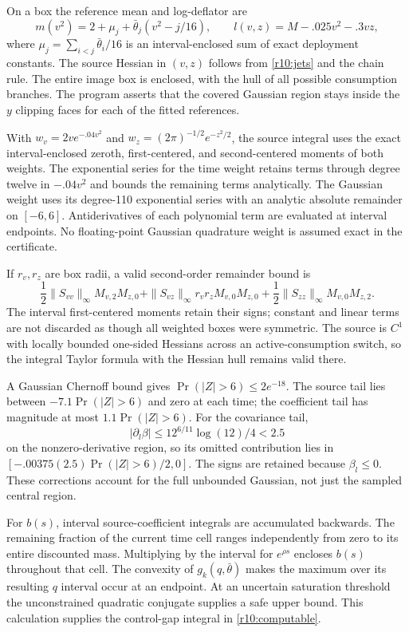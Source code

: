 On a box the reference mean and log-deflator are
\[
 m(v^2)=2+\mu_j+\bar\theta_j(v^2-j/16),\qquad
 l(v,z)=M-.025v^2-.3vz,
\]
where $\mu_j=\sum_{i<j}\bar\theta_i/16$ is an interval-enclosed sum of exact deployment constants. The source Hessian in $(v,z)$ follows from \eqref{r10:jets} and the chain rule. The entire image box is enclosed, with the hull of all possible consumption branches. The program asserts that the covered Gaussian region stays inside the $y$ clipping faces for each of the fitted references.

With $w_v=2ve^{-.04v^2}$ and $w_z=(2\pi)^{-1/2}e^{-z^2/2}$, the source integral uses the exact interval-enclosed zeroth, first-centered, and second-centered moments of both weights. The exponential series for the time weight retains terms through degree twelve in $-.04v^2$ and bounds the remaining terms analytically. The Gaussian weight uses its degree-110 exponential series with an analytic absolute remainder on $[-6,6]$. Antiderivatives of each polynomial term are evaluated at interval endpoints. No floating-point Gaussian quadrature weight is assumed exact in the certificate.

If $r_v,r_z$ are box radii, a valid second-order remainder bound is
\[
 \frac12\|S_{vv}\|_\infty M_{v,2}M_{z,0}
 +\|S_{vz}\|_\infty r_vr_zM_{v,0}M_{z,0}
 +\frac12\|S_{zz}\|_\infty M_{v,0}M_{z,2}.
\]
The interval first-centered moments retain their signs; constant and linear terms are not discarded as though all weighted boxes were symmetric. The source is $C^1$ with locally bounded one-sided Hessians across an active-consumption switch, so the integral Taylor formula with the Hessian hull remains valid there.

A Gaussian Chernoff bound gives $\Pr(|Z|>6)\leq2e^{-18}$. The source tail lies between $-7.1\Pr(|Z|>6)$ and zero at each time; the coefficient tail has magnitude at most $1.1\Pr(|Z|>6)$. For the covariance tail,
\[
 |\partial_l\beta|\leq12^{6/11}\log(12)/4<2.5
\]
on the nonzero-derivative region, so its omitted contribution lies in
$[-.00375(2.5)\Pr(|Z|>6)/2,0]$. The signs are retained because $\beta_l\leq0$. These corrections account for the full unbounded Gaussian, not just the sampled central region.

For $b(s)$, interval source-coefficient integrals are accumulated backwards. The remaining fraction of the current time cell ranges independently from zero to its entire discounted mass. Multiplying by the interval for $e^{\rho s}$ encloses $b(s)$ throughout that cell. The convexity of $g_k(q,\bar\theta)$ makes the maximum over its resulting $q$ interval occur at an endpoint. At an uncertain saturation threshold the unconstrained quadratic conjugate supplies a safe upper bound. This calculation supplies the control-gap integral in \eqref{r10:computable}.

